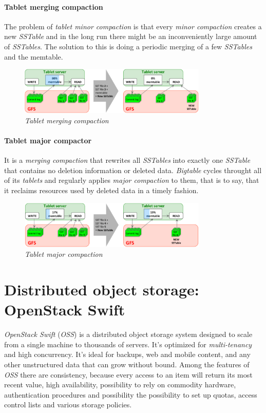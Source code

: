\paragraph{Tablet merging compaction}
The problem of \emph{tablet minor compaction} is that every \emph{minor
compaction} creates a new \emph{SSTable} and in the long run there might be
an inconveniently large amount of \emph{SSTables}. The solution to this is
doing a periodic merging of a few \emph{SSTables} and the memtable.

\begin{figure}[ht!]
    \centering
    \includegraphics[width=0.8\textwidth]{images/gbt-tablet-merge-comp.png}
    \caption{\emph{Tablet merging compaction}}
\end{figure}

\paragraph{Tablet major compactor}
It is a \emph{merging compaction} that rewrites all \emph{SSTables} into
exactly one \emph{SSTable} that contains no deletion information or deleted
data. \emph{Bigtable} cycles throught all of its \emph{tablets} and regularly
applies \emph{major compaction} to them, that is to say, that it reclaims
resources used by deleted data in a timely fashion.

\begin{figure}[h!]
    \centering
    \includegraphics[width=0.8\textwidth]{images/gbt-tablet-major-comp.png}
    \caption{\emph{Tablet major compaction}}
\end{figure}

\section{Distributed object storage: OpenStack Swift}
\emph{OpenStack Swift} (\emph{OSS}) is a distributed object storage system
designed to scale from a single machine to thousands of servers. It's optimized
for \emph{multi-tenancy} and high concurrency. It's ideal for backups, web and
mobile content, and any other unstructured data that can grow without bound.
Among the features of \emph{OSS} there are consistency, because every access to
an item will return its most recent value, high availability, possibility to
rely on commodity hardware, authentication procedures and possibility the
possibility to set up quotas, access control lists and various storage policies.

